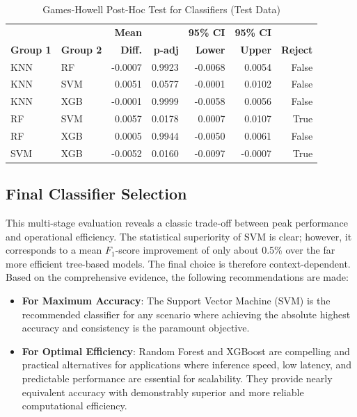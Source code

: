 \begin{table}[!htbp]
    \captionsetup{skip=5pt}
\centering
\caption{Games-Howell Post-Hoc Test for Classifiers (Test Data)}
\label{tbl:games_howell_classifier_full}
        \begin{tabular}{llrrrrr}
            \toprule
             &  & \textbf{Mean} &  & \textbf{95\% CI} & \textbf{95\% CI} & \\
            \textbf{Group 1} & \textbf{Group 2} & \textbf{Diff.} & \textbf{p-adj} & \textbf{Lower} & \textbf{Upper} & \textbf{Reject}\\
\midrule
KNN & RF & -0.0007 & 0.9923 & -0.0068 & 0.0054 & False \\
KNN & SVM & 0.0051 & 0.0577 & -0.0001 & 0.0102 & False \\
KNN & XGB & -0.0001 & 0.9999 & -0.0058 & 0.0056 & False \\
RF & SVM & 0.0057 & 0.0178 & 0.0007 & 0.0107 & True \\
RF & XGB & 0.0005 & 0.9944 & -0.0050 & 0.0061 & False \\
SVM & XGB & -0.0052 & 0.0160 & -0.0097 & -0.0007 & True \\
\bottomrule
\end{tabular}
\end{table}

\subsection{Final Classifier Selection}\label{ch:4.5.4}
This multi-stage evaluation reveals a classic trade-off between peak performance and operational efficiency. The statistical superiority of SVM is clear; however, it corresponds to a mean \(F_1\)-score improvement of only about 0.5\% over the far more efficient tree-based models. The final choice is therefore context-dependent. Based on the comprehensive evidence, the following recommendations are made:
\begin{itemize}
    \item \textbf{For Maximum Accuracy}: The Support Vector Machine (SVM) is the recommended classifier for any scenario where achieving the absolute highest accuracy and consistency is the paramount objective.
    \item \textbf{For Optimal Efficiency}: Random Forest and XGBoost are compelling and practical alternatives for applications where inference speed, low latency, and predictable performance are essential for scalability. They provide nearly equivalent accuracy with demonstrably superior and more reliable computational efficiency.
\end{itemize}

